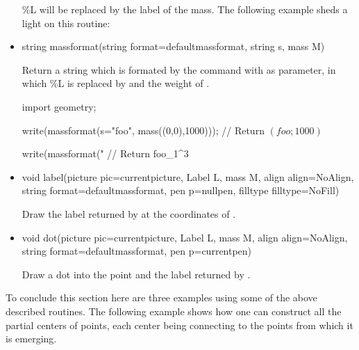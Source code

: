 \documentclass[pdftex]{article}
\begin{document}
\begin{itemize}
  \%L will be replaced by the label of the mass. The following
  example sheds a light on this routine:
  \vspace*{2mm}
\item {}
  \begin{Vcolor}
    string massformat(string format=defaultmassformat,
    string s, mass M)
  \end{Vcolor}
  Return a string which is formated by the command 
  with  as parameter, in which \%L is replaced
  by  and the weight of .
  \begin{Vcolor}
    import geometry;

    write(massformat(s="foo", mass((0,0),1000)));
    // Return $\left(foo;1000\right)$


    write(massformat("%
    // Return foo\_1\!\times{}^{3\phantom{+}}

  \end{Vcolor}
  \vspace*{2mm}
\item {}
  \begin{Vcolor}
    void label(picture pic=currentpicture, Label L, mass M,
    align align=NoAlign, string format=defaultmassformat,
    pen p=nullpen, filltype filltype=NoFill)
  \end{Vcolor}
  Draw the label returned by  at the coordinates of .
\item {}
  \begin{Vcolor}
    void dot(picture pic=currentpicture, Label L, mass M, align align=NoAlign,
    string format=defaultmassformat, pen p=currentpen)
  \end{Vcolor}
  Draw a dot into the point  and the label returned by  .
\end{itemize}

To conclude this section here are three examples using some of the
above described routines.
The following example shows how one can construct all the partial
centers of  points, each center being connecting to the
points from which it is emerging.
\end{document}
